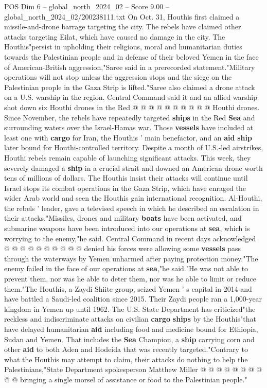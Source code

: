 \begin{textsample}{POS Dim 6 – global\_north\_2024\_02 – Score 9.00 – global\_north\_2024\_02/200238111.txt}
On Oct. 31, Houthis first claimed a missile-and-drone barrage targeting the city.
The rebels have claimed other attacks targeting Eilat, which have caused no damage in the city.
The Houthis"persist in upholding their religious, moral and humanitarian duties towards the Palestinian people and in defense of their beloved Yemen in the face of American-British aggression,"Saree said in a prerecorded statement."Military operations will not stop unless the aggression stops and the siege on the Palestinian people in the Gaza Strip is lifted."Saree also claimed a drone attack on a U.S. warship in the region.
Central Command said it and an allied warship shot down six Houthi drones in the Red @ @ @ @ @ @ @ @ @ @ Houthi drones.
Since November, the rebels have repeatedly targeted \textbf{ships} in the Red \textbf{Sea} and surrounding waters over the Israel-Hamas war.
Those \textbf{vessels} have included at least one with \textbf{cargo} for Iran, the Houthis ' main benefactor, and an \textbf{aid} \textbf{ship} later bound for Houthi-controlled territory.
Despite a month of U.S.-led airstrikes, Houthi rebels remain capable of launching significant attacks.
This week, they severely damaged a \textbf{ship} in a crucial strait and downed an American drone worth tens of millions of dollars.
The Houthis insist their attacks will continue until Israel stops its combat operations in the Gaza Strip, which have enraged the wider Arab world and seen the Houthis gain international recognition.
Al-Houthi, the rebels ' leader, gave a televised speech in which he described an escalation in their attacks."Missiles, drones and military \textbf{boats} have been activated, and submarine weapons have been introduced into our operations at \textbf{sea}, which is worrying to the enemy,"he said.
Central Command in recent days acknowledged @ @ @ @ @ @ @ @ @ @ denied his forces were allowing some \textbf{vessels} pass through the waterways by Yemen unharmed after paying protection money."The enemy failed in the face of our operations at \textbf{sea},"he said."He was not able to prevent them, nor was he able to deter them, nor was he able to limit or reduce them."The Houthis, a Zaydi Shiite group, seized Yemen ' s capital in 2014 and have battled a Saudi-led coalition since 2015.
Their Zaydi people ran a 1,000-year kingdom in Yemen up until 1962.
The U.S.
State Department has criticized"the reckless and indiscriminate attacks on civilian \textbf{cargo} \textbf{ships} by the Houthis"that have delayed humanitarian \textbf{aid} including food and medicine bound for Ethiopia, Sudan and Yemen.
That includes the \textbf{Sea} Champion, a \textbf{ship} carrying corn and other \textbf{aid} to both Aden and Hodeida that was recently targeted."Contrary to what the Houthis may attempt to claim, their attacks do nothing to help the Palestinians,"State Department spokesperson Matthew Miller @ @ @ @ @ @ @ @ @ @ bringing a single morsel of assistance or food to the Palestinian people."

\end{textsample}
